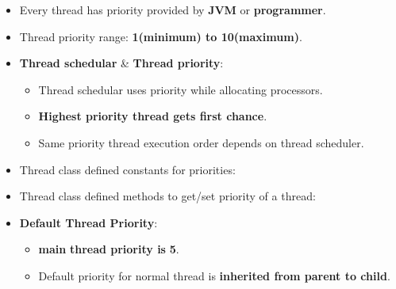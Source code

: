 \setlength{\columnsep}{3pt}
\begin{flushleft}

	\begin{itemize}
		\item Every thread has priority provided by \textbf{JVM} or \textbf{programmer}.
		\item Thread priority range: \textbf{1(minimum) to 10(maximum)}.
		\item \textbf{Thread schedular} \& \textbf{Thread priority}:
		\begin{itemize}
			\item Thread schedular uses priority while allocating processors. 
			\item \textbf{Highest priority thread gets first chance}.
			\item Same priority thread execution order depends on thread scheduler.
		\end{itemize}
		
		\item Thread class defined constants for priorities:
		\bigskip
		\item Thread class defined methods to get/set priority of a thread:
		\bigskip
	\bigskip
	\item \textbf{Default Thread Priority}:
	\begin{itemize}
		\item \textbf{main} \textbf{thread priority is} \textbf{5}.
		\item Default priority for normal thread is \textbf{inherited from parent to child}.
	\end{itemize}


\end{itemize}
\end{flushleft}
